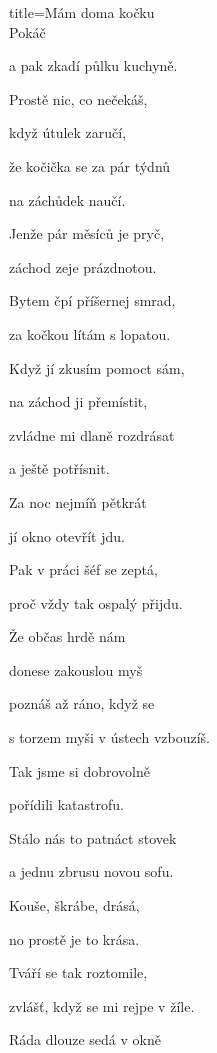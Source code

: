 \begin{song}{title=\centering Mám doma kočku\\\normalsize Pokáč \vspace*{-0.3cm}}
{\begin{minipage}[t]{0.48\textwidth}
   a pak zkadí půlku kuchyně.
   
   
\sloka
   Prostě nic, co nečekáš,
   
   když útulek zaručí,
   
   že kočička se za pár týdnů
   
   na záchůdek naučí.
  
  
\end{minipage}\begin{minipage}[t]{0.5\textwidth}\setlength{\parindent}{0.45cm}\vspace*{0.65cm}  %

\sloka   
   Jenže pár měsíců je pryč,
   
   záchod zeje prázdnotou.
   
   Bytem čpí příšernej smrad,
   
   za kočkou lítám s lopatou.
 
 
\sloka
   Když jí zkusím pomoct sám,
   
   na záchod ji přemístit,
   
   zvládne mi dlaně rozdrásat
   
   a ještě potřísnit.
  
   
   
   
\sloka
   Za noc nejmíň pětkrát
   
   jí okno otevřít jdu.
   
   Pak v práci šéf se zeptá,
   
   proč vždy tak ospalý přijdu.
   
   
\sloka
   Že občas hrdě nám
   
   donese zakouslou myš
   
   poznáš až ráno, když se
   
   s torzem myši v ústech vzbouzíš.
  
   
\sloka
   Tak jsme si dobrovolně
   
   pořídili katastrofu.
   
   Stálo nás to patnáct stovek
   
   a jednu zbrusu novou sofu.
   
   
\sloka
   Kouše, škrábe, drásá,
   
   no prostě je to krása.
   
   Tváří se tak roztomile,
   
   zvlášť, když se mi rejpe v žíle.
   
   
   
   
\sloka
   Ráda dlouze sedá v okně
   

\end{minipage}}
\end{song}
